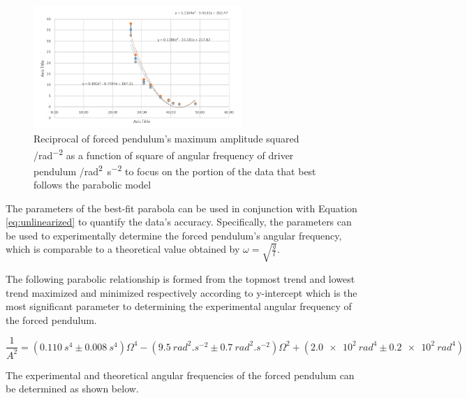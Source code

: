 \documentclass[letterpaper, 12pt]{article}
\begin{document}
\begin{figure}[H]
    \centering
    \includegraphics[width=0.7\textwidth]{restrictedGraph.png}
    \caption{Reciprocal of forced pendulum's maximum amplitude squared /\unit{rad^{-2}} as a function of square of angular frequency of driver pendulum /\unit{rad^2.s^{-2}} to focus on the portion of the data that best follows the parabolic model}
    \label{fig:restrictedGraph}
\end{figure}

The parameters of the best-fit parabola can be
used in conjunction with Equation \ref*{eq:unlinearized}
to quantify the data's accuracy. Specifically,
the parameters can be used to experimentally determine
the forced pendulum's angular frequency, which is
comparable to a theoretical value obtained by \(\omega = \sqrt{\frac{g}{l}}\).

The following parabolic relationship is formed from the
topmost trend and lowest trend maximized and minimized
respectively according to y-intercept which
is the most significant parameter to determining
the experimental angular frequency of the forced pendulum.

\begin{equation}
    \frac{1}{A^2} = ( \SI{0.110}{s^4} \pm \SI{0.008}{s^4} )\Omega^4 - ( \SI{9.5}{rad^2.s^{-2}} \pm \SI{0.7}{rad^2.s^{-2}} )\Omega^2 + ( \SI{2.0e2}{rad^4} \pm \SI{0.2e2}{rad^4} )
\end{equation}

The experimental and theoretical angular frequencies of the forced pendulum can be
determined as shown below.
\end{document}
